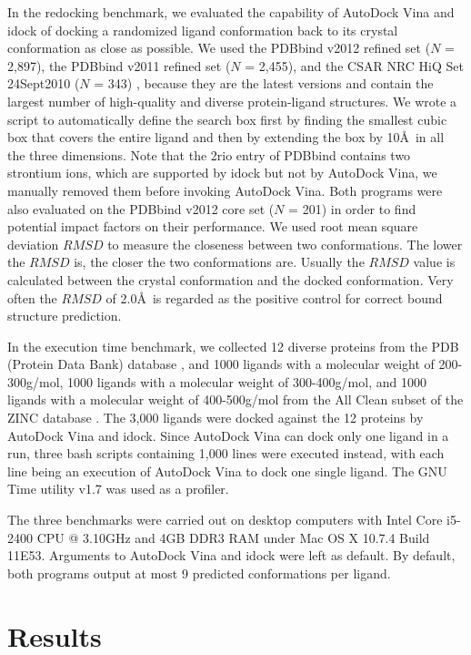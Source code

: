 In the redocking benchmark, we evaluated the capability of AutoDock Vina and idock of docking a randomized ligand conformation back to its crystal conformation as close as possible. We used the PDBbind v2012 \cite{529,530} refined set ($N$ = 2,897), the PDBbind v2011 refined set ($N$ = 2,455), and the CSAR NRC HiQ Set 24Sept2010 ($N$ = 343) \cite{857,960}, because they are the latest versions and contain the largest number of high-quality and diverse protein-ligand structures. We wrote a script to automatically define the search box first by finding the smallest cubic box that covers the entire ligand and then by extending the box by 10\AA\ in all the three dimensions. Note that the 2rio entry of PDBbind contains two strontium ions, which are supported by idock but not by AutoDock Vina, we manually removed them before invoking AutoDock Vina. Both programs were also evaluated on the PDBbind v2012 core set ($N$ = 201) in order to find potential impact factors on their performance. We used root mean square deviation $RMSD$ to measure the closeness between two conformations. The lower the $RMSD$ is, the closer the two conformations are. Usually the $RMSD$ value is calculated between the crystal conformation and the docked conformation. Very often the $RMSD$ of 2.0\AA\ is regarded as the positive control for correct bound structure prediction. 

In the execution time benchmark, we collected 12 diverse proteins from the PDB (Protein Data Bank) database \cite{540,537}, and 1000 ligands with a molecular weight of 200-300g/mol, 1000 ligands with a molecular weight of 300-400g/mol, and 1000 ligands with a molecular weight of 400-500g/mol from the All Clean subset of the ZINC database \cite{532,1178}. The 3,000 ligands were docked against the 12 proteins by AutoDock Vina and idock. Since AutoDock Vina can dock only one ligand in a run, three bash scripts containing 1,000 lines were executed instead, with each line being an execution of AutoDock Vina to dock one single ligand. The GNU Time utility v1.7 was used as a profiler.

The three benchmarks were carried out on desktop computers with Intel Core i5-2400 CPU @ 3.10GHz and 4GB DDR3 RAM under Mac OS X 10.7.4 Build 11E53. Arguments to AutoDock Vina and idock were left as default. By default, both programs output at most 9 predicted conformations per ligand.

\section{Results}

